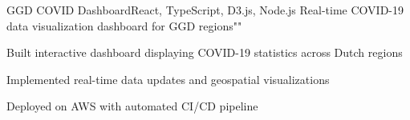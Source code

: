 \resumeSubheading
  {GGD COVID Dashboard}{React, TypeScript, D3.js, Node.js}
  {Real-time COVID-19 data visualization dashboard for GGD regions}{""}
  \vspace{\experienceItemSpacing}
  \resumeItemListStart
\item Built interactive dashboard displaying COVID-19 statistics across Dutch regions
\item Implemented real-time data updates and geospatial visualizations
\item Deployed on AWS with automated CI/CD pipeline
  \resumeItemListEnd